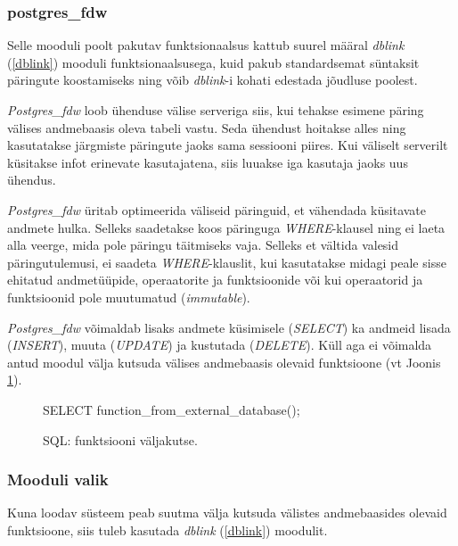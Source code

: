 \documentclass[a4paper,12pt]{article} %
\begin{document}
\subsubsection{postgres\_fdw}
Selle mooduli poolt pakutav funktsionaalsus kattub suurel määral \textit{dblink} (\ref{dblink}) mooduli funktsionaalsusega, kuid pakub standardsemat süntaksit päringute koostamiseks ning võib \textit{dblink}-i kohati edestada jõudluse poolest.\par
\textit{Postgres\_fdw} loob ühenduse välise serveriga siis, kui tehakse esimene päring välises andmebaasis oleva tabeli vastu. Seda ühendust hoitakse alles ning kasutatakse järgmiste päringute jaoks sama sessiooni piires. Kui väliselt serverilt küsitakse infot erinevate kasutajatena, siis luuakse iga kasutaja jaoks uus ühendus.\par
\textit{Postgres\_fdw} üritab optimeerida väliseid päringuid, et vähendada küsitavate andmete hulka. Selleks saadetakse koos päringuga \textit{WHERE}-klausel ning ei laeta alla veerge, mida pole päringu täitmiseks vaja. Selleks et vältida valesid päringutulemusi, ei saadeta \textit{WHERE}-klauslit, kui kasutatakse midagi peale sisse ehitatud andmetüüpide, operaatorite ja funktsioonide või kui operaatorid ja funktsioonid pole muutumatud (\textit{immutable}). \cite{PostgreSQLfdw}\par
\textit{Postgres\_fdw} võimaldab lisaks andmete küsimisele (\textit{SELECT}) ka andmeid lisada (\textit{INSERT}), muuta (\textit{UPDATE}) ja kustutada (\textit{DELETE}). Küll aga ei võimalda antud moodul välja kutsuda välises andmebaasis olevaid funktsioone (vt Joonis \ref{fig_sql_funktsiooni_väljakutse}).
\begin{figure}[H]
\centering
\begin{SQL}
SELECT function_from_external_database();
\end{SQL}
\caption{SQL: funktsiooni väljakutse.}
\label{fig_sql_funktsiooni_väljakutse}
\end{figure}

\subsubsection{Mooduli valik}
Kuna loodav süsteem peab suutma välja kutsuda välistes andmebaasides olevaid funktsioone, siis tuleb kasutada \textit{dblink} (\ref{dblink}) moodulit.
\end{document}

